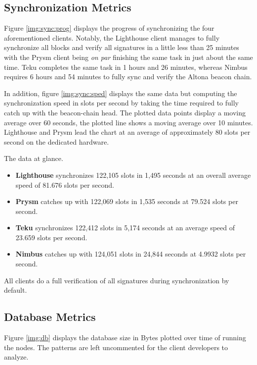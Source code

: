 \documentclass[twoside,twocolumn]{article}
\begin{document}
\subsection{Synchronization Metrics}
Figure \ref{img:sync:prog} displays the progress of synchronizing the four aforementioned clients. Notably, the Lighthouse client manages to fully synchronize all blocks and verify all signatures in a little less than 25 minutes with the Prysm client being \textit{on par} finishing the same task in just about the same time. Teku completes the same task in 1 hours and 26 minutes, whereas Nimbus requires 6 hours and 54 minutes to fully sync and verify the Altona beacon chain.\par

In addition, figure \ref{img:sync:sped} displays the same data but computing the synchronization speed in slots per second by taking the time required to fully catch up with the beacon-chain head. The plotted data points display a moving average over 60 seconds, the plotted line shows a moving average over 10 minutes. Lighthouse and Prysm lead the chart at an average of approximately 80 slots per second on the dedicated hardware.\par

The data at glance.
\begin{itemize}
\item \textbf{Lighthouse} synchronizes 122,105 slots in 1,495 seconds at an overall average speed of 81.676 slots per second.
\item \textbf{Prysm} catches up with 122,069 slots in 1,535 seconds at 79.524 slots per second.
\item \textbf{Teku} synchronizes 122,412 slots in 5,174 seconds at an average speed of 23.659 slots per second.
\item \textbf{Nimbus} catches up with 124,051 slots in 24,844 seconds at 4.9932 slots per second.
\end{itemize}

All clients do a full verification of all signatures during synchronization by default.\par

\subsection{Database Metrics}
Figure \ref{img:db} displays the database size in Bytes plotted over time of running the nodes. The patterns are left uncommented for the client developers to analyze.\par
\end{document}
